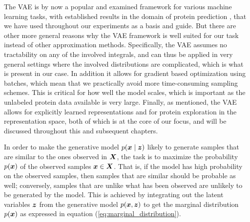 The VAE is by now a popular and examined framework for various machine learning tasks, with established results in the domain of protein prediction \cite{riesselman2018deep}, that we have used throughout our experiments as a basis and guide. But there are other more general reasons why the VAE framework is well suited for our task instead of other approximation methods. Specifically, the VAE assumes no tractability on any of the involved integrals, and can thus be applied in very general settings where the involved distributions are complicated, which is what is present in our case. In addition it allows for gradient based optimization using batches, which mean that we practically avoid more time-consuming sampling schemes. This is critical for how well the model scales, which is important as the unlabeled protein data available is very large. Finally, as mentioned, the VAE allows for explicitly learned representations and for protein exploration in the representation space, both of which is at the core of our focus, and will be discussed throughout this and subsequent chapters.

In order to make the generative model $p(\bm{ x } \mid \bm{ z })$ likely to generate samples that are similar to the ones observed in $\bm{ X }$, the task is to maximize the probability $p(\bm{ x })$ of the observed samples $\bm{ x } \in \bm{ X }$. That is, if the model has high probability on the observed samples, then samples that are similar should be probable as well; conversely, samples that are unlike what has been observed are unlikely to be generated by the model. This is achieved by integrating out the latent variables $\bm{ z }$ from the generative model $p(\bm{ x }, \bm{ z })$ to get the marginal distribution $p(\bm{ x })$ as expressed in equation (\ref{eq:marginal_distribution}).

